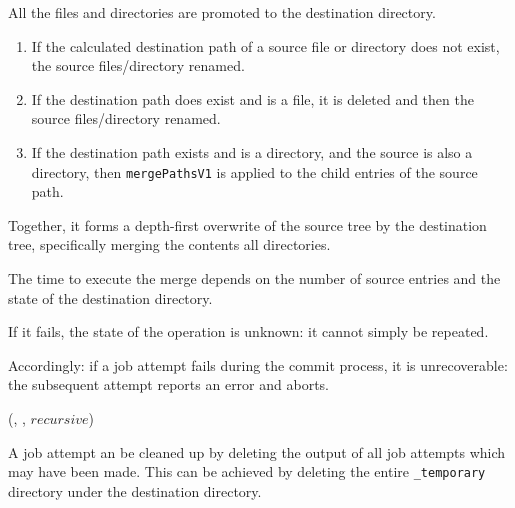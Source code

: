 \documentclass[conference]{IEEEtran}
\begin{document}
All the files and directories are promoted to the destination directory.

\begin{enumerate}
  \item If the calculated destination path of a source file or directory does
  not exist, the source files/directory renamed.
  \item If the destination path does exist and is a file, it is deleted and then
  the source files/directory renamed.
  \item If the destination path exists and is a directory, and the source
  is also a directory, then \texttt{mergePathsV1} is applied to the child
  entries of the source path.
\end{enumerate}

Together, it forms a depth-first overwrite of the source tree by the destination
tree, specifically merging the contents all directories.

The time to execute the merge depends on the number of source entries
and the state of the destination directory.

If it fails, the state of the operation is unknown: it cannot simply
be repeated.


\begin{function}

  \false

\caption{v1.isCommitJobRepeatable()}
\label{v1.isCommitJobRepeatable}

\end{function}

Accordingly: if a job attempt fails during the commit process, it is
unrecoverable: the subsequent attempt reports an error and aborts.

\begin{procedure}
\FileOutputCommitVars

  \delete(\fs, \jobAttemptPath, $recursive$)\;

\caption{v1.abortJob()}
\label{alg:v1.abortJob}

\end{procedure}

A job attempt an be cleaned up by deleting the output of all job attempts which
may have been made.
This can be achieved by deleting the entire \texttt{_temporary} directory
under the destination directory.
\end{document}
